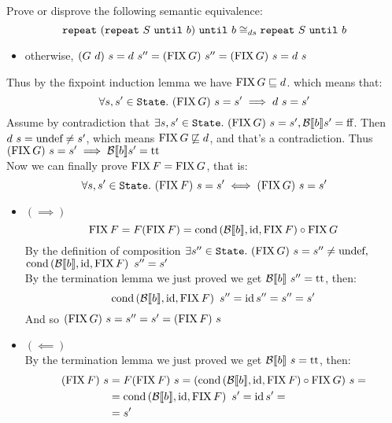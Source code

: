 \begin{exercise}{
    Prove or disprove the following semantic equivalence:
    \[ \wrepeat{(\wrepeat{S}{b})}{b} \DScong \wrepeat{S}{b} \]
}
\begin{itemize}
\begin{itemize}
                \item otherwise, $(G\ d)\ s = d\ s'' = (\FIX G)\ s'' = (\FIX G)\ s = d\ s$
            \end{itemize}
    \end{itemize}
    Thus by the fixpoint induction lemma we have $\FIX G \sqsubseteq d$. which means that:
    \[ \forall s, s' \in \State.\ (\FIX G)\ s = s' \implies d\ s = s' \]
    Assume by contradiction that $\exists s, s' \in \State.\ (\FIX G)\ s = s', \Bool{b} s' = \False $. Then $d\ s = \undef \neq s'$, which means $\FIX G \not\sqsubseteq d$, and that's a contradiction. Thus $(\FIX G)\ s = s' \implies \Bool{b} s' = \True$ \\
    Now we can finally prove $\FIX F = \FIX G$, that is:
    \[ \forall s, s' \in \State.\ (\FIX F)\ s = s' \iff (\FIX G)\ s = s' \]
    \begin{itemize}
        \item $(\implies)$
            \[ \FIX F = F(\FIX F) = \cond{\Bool{b}}{\id}{\FIX F} \circ \FIX G \]
            By the definition of composition $\exists s'' \in \State.\ (\FIX G)\ s = s'' \neq \undef,$ \\ $\cond{\Bool{b}}{\id}{\FIX F}\ s'' = s'$ \\
            By the termination lemma we just proved we get $\Bool{b}\ s'' = \True$, then:
            \[ \cond{\Bool{b}}{\id}{\FIX F}\ s'' = \id s'' = s'' = s' \]
            And so $(\FIX G)\ s = s'' = s' = (\FIX F)\ s$
        \item $(\impliedby)$ \\
            By the termination lemma we just proved we get $\Bool{b}\ s = \True$, then:
            \begin{align*}
                (\FIX F)\ s &= F(\FIX F)\ s = (\cond{\Bool{b}}{\id}{\FIX F} \circ \FIX G)\ s = \\
                &= \cond{\Bool{b}}{\id}{\FIX F}\ s' = \id s' = \\
                &= s'
            \end{align*}
    \end{itemize}
\end{exercise}
